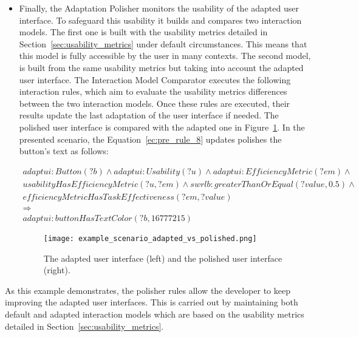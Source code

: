 \begin{itemize}
\begin{itemize}
    \item Finally, the Adaptation Polisher monitors the usability of the adapted
    user interface. To safeguard this usability it builds and compares two
    interaction models. The first one is built with the usability metrics detailed
    in Section~\ref{sec:usability_metrics} under default circumstances. This means
    that this model is fully accessible by the user in many contexts. The second 
    model, is built from the same usability metrics but taking into account the 
    adapted user interface. The Interaction Model Comparator executes the following
    interaction rules, which aim to evaluate the usability metrics differences
    between the two interaction models. Once these rules are executed, their
    results update the last adaptation of the user interface if needed. The
    polished user interface is compared with the adapted one in 
    Figure~\ref{fig:example_scenario_adapted_vs_polished}. In the presented
    scenario, the Equation~\ref{ec:pre_rule_8} updates polishes the button's
    text as follows: 

    \footnotesize
    \begin{equation} \label{ec:pre_rule_8} 
    \begin{align*} 
    adaptui:Button(?b) ∧ adaptui:Usability (?u) ∧ adaptui:EfficiencyMetric(?em) ∧ \\
    usabilityHasEfficiencyMetric(?u, ?em) ∧ swrlb:greaterThanOrEqual(?value, 0.5) ∧ \\
    efficiencyMetricHasTaskEffectiveness(?em, ?value)\\
    \Rightarrow \\
    adaptui:buttonHasTextColor(?b, 16777215)
    \end{align*}
    \end{equation}
    \normalsize

    \begin{figure}
    \centering
    \texttt{[image: example\_scenario\_adapted\_vs\_polished.png]}
    \caption{The adapted user interface (left) and the polished user interface (right).}
    \label{fig:example_scenario_adapted_vs_polished}
    \end{figure}

  \end{itemize}

\end{itemize}

As this example demonstrates, the polisher rules allow the developer to keep
improving the adapted user interfaces. This is carried out by maintaining both
default and adapted interaction models which are based on the usability metrics
detailed in Section~\ref{sec:usability_metrics}.

